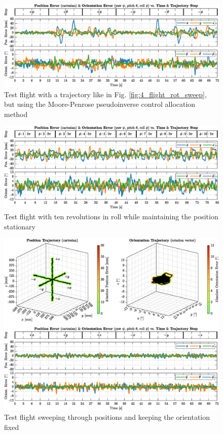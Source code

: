 \documentclass[conference]{IEEEtran}
\begin{document}

\begin{figure}[t!]
	\includegraphics[width=\textwidth]{img/4_flight_no_sqp.eps}
	\centering
	\caption{Test flight with a trajectory like in Fig. \ref{fig:4_flight_rot_sweep}, but using the Moore-Penrose pseudoinverse control allocation method}
	\label{fig:4_flight_no_sqp}
	\vspace{-4pt}
\end{figure}
\begin{figure}
	\vspace{16pt}
	\includegraphics[width=\textwidth]{img/4_flight_cont_rot.eps}
	\centering
	\caption{Test flight with ten revolutions in roll while maintaining the position stationary}
	\label{fig:4_flight_cont_rot}
	\vspace{-4pt}
\end{figure}
\begin{figure}
	\includegraphics[width=\textwidth]{img/4_flight_pos_sweep.eps}
	\centering
	\caption{Test flight sweeping through positions and keeping the orientation fixed}
	\label{fig:4_flight_pos_sweep}
	\vspace{-4pt}
\end{figure}
\vspace{8pt}
\end{document}

